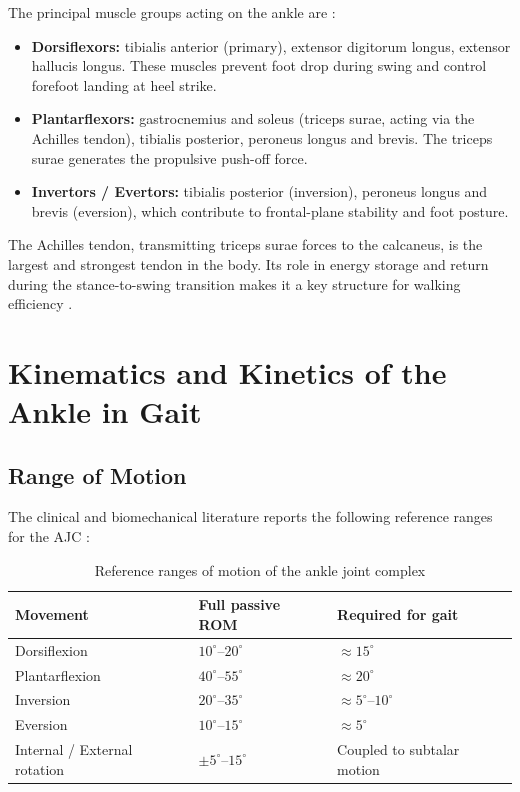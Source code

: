 The principal muscle groups acting on the ankle are \cite{Winter2009, Brockett2016}:
\begin{itemize}
    \item \textbf{Dorsiflexors:} tibialis anterior (primary), extensor digitorum longus, extensor hallucis longus. These muscles prevent foot drop during swing and control forefoot landing at heel strike.
    \item \textbf{Plantarflexors:} gastrocnemius and soleus (triceps surae, acting via the Achilles tendon), tibialis posterior, peroneus longus and brevis. The triceps surae generates the propulsive push-off force.
    \item \textbf{Invertors / Evertors:} tibialis posterior (inversion), peroneus longus and brevis (eversion), which contribute to frontal-plane stability and foot posture.
\end{itemize}

The Achilles tendon, transmitting triceps surae forces to the calcaneus, is the largest and strongest tendon in the body.
Its role in energy storage and return during the stance-to-swing transition makes it a key structure for walking efficiency \cite{Shamaei2013, Hansen2004}.

\section{Kinematics and Kinetics of the Ankle in Gait}

\subsection{Range of Motion}

The clinical and biomechanical literature reports the following reference ranges for the AJC \cite{Brockett2016, Tsoi2009, Winter2009}:

\begin{table}[h]
\centering
\caption{Reference ranges of motion of the ankle joint complex}
\label{tab:ankle_rom}
\begin{tabular}{|p{}|p{}|p{}|}
\hline
\rowcolor{Gray}
\textbf{Movement} & \textbf{Full passive ROM} & \textbf{Required for gait} \\
\hline
Dorsiflexion & $10^{\circ}$--$20^{\circ}$ & $\approx 15^{\circ}$ \\
\hline
Plantarflexion & $40^{\circ}$--$55^{\circ}$ & $\approx 20^{\circ}$ \\
\hline
Inversion & $20^{\circ}$--$35^{\circ}$ & $\approx 5^{\circ}$--$10^{\circ}   $ \\
\hline
Eversion & $10^{\circ}$--$15^{\circ}$ & $\approx 5^{\circ}$ \\
\hline
Internal / External rotation & $\pm 5^{\circ}$--$15^{\circ}$ & Coupled to subtalar motion \\
\hline
\end{tabular}
\end{table}

